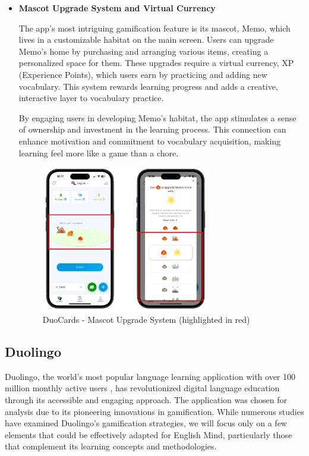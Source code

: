 \begin{itemize}
    \item \textbf{Mascot Upgrade System and Virtual Currency}

    The app’s most intriguing gamification feature is its mascot, Memo, which lives in a customizable habitat on the main screen. Users can upgrade Memo’s home by purchasing and arranging various items, creating a personalized space for them. These upgrades require a virtual currency, XP (Experience Points), which users earn by practicing and adding new vocabulary. This system rewards learning progress and adds a creative, interactive layer to vocabulary practice.

    By engaging users in developing Memo’s habitat, the app stimulates a sense of ownership and investment in the learning process. This connection can enhance motivation and commitment to vocabulary acquisition, making learning feel more like a game than a chore. 

    \begin{figure}[!h]
        \includegraphics[width=0.7\textwidth]{src/figures/duocards-memo.png}
        \caption{DuoCards - Mascot Upgrade System (highlighted in red)}
        \label{fig:duocards-memo}
    \end{figure}

\end{itemize}

\subsection{Duolingo}

Duolingo, the world's most popular language learning application with over 100 million monthly active users \cite{cite:duolingo_2024q2}, has revolutionized digital language education through its accessible and engaging approach. The application was chosen for analysis due to its pioneering innovations in gamification. While numerous studies have examined Duolingo's gamification strategies, we will focus only on a few elements that could be effectively adapted for English Mind, particularly those that complement its learning concepts and methodologies.

